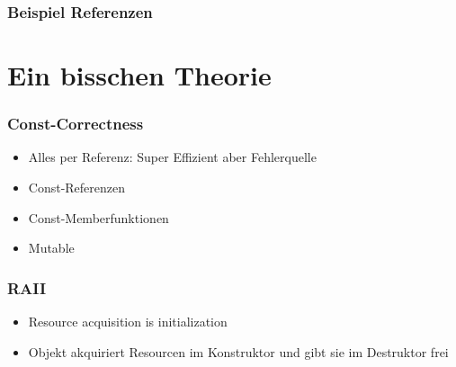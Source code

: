 \documentclass[aspectratio=169]{beamer}
\begin{document}
\begin{frame}
    \frametitle{Beispiel Referenzen}
\end{frame}

\section{Ein bisschen Theorie}

\begin{frame}
    \frametitle{Const-Correctness}
    \begin{itemize}
        \item Alles per Referenz: Super Effizient aber Fehlerquelle
            \pause
        \item Const-Referenzen
            \pause
        \item Const-Memberfunktionen
            \pause
        \item Mutable
    \end{itemize}
\end{frame}

\begin{frame}
    \frametitle{RAII}
    \begin{itemize}
        \item Resource acquisition is initialization
            \pause
        \item Objekt akquiriert Resourcen im Konstruktor und gibt sie im
            Destruktor frei
            \pause
    \end{itemize}
\end{frame}
\end{document}
